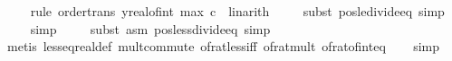 \begin{isabellebody}
\ \ \ \isamarkupfalse%
\ {\isacharparenleft}{\kern0pt}rule\ order{\isacharunderscore}{\kern0pt}trans{\isacharbrackleft}{\kern0pt}\ y{\isacharequal}{\kern0pt}{\isachardoublequoteopen}real{\isacharunderscore}{\kern0pt}of{\isacharunderscore}{\kern0pt}int\ {\isacharparenleft}{\kern0pt}max\ {\isasymlceil}c{\isasymrceil}\ {}{\isacharparenright}{\kern0pt}{\isachardoublequoteclose}{\isacharbrackright}{\kern0pt}{\isacharcomma}{\kern0pt}\ linarith{\isacharparenright}{\kern0pt}\isanewline
\ \ \ \isamarkupfalse%
\ {\isacharparenleft}{\kern0pt}subst\ pos{\isacharunderscore}{\kern0pt}le{\isacharunderscore}{\kern0pt}divide{\isacharunderscore}{\kern0pt}eq{\isacharcomma}{\kern0pt}\ simp{\isacharparenright}{\kern0pt}\isanewline
\ \ \ \isamarkupfalse%
\ simp\isanewline
\ \ \ \isamarkupfalse%
\ {\isacharparenleft}{\kern0pt}subst\ {\isacharparenleft}{\kern0pt}asm{\isacharparenright}{\kern0pt}\ pos{\isacharunderscore}{\kern0pt}less{\isacharunderscore}{\kern0pt}divide{\isacharunderscore}{\kern0pt}eq{\isacharcomma}{\kern0pt}\ simp{\isacharparenright}{\kern0pt}\isanewline
\ \ \ \isamarkupfalse%
\ {\isacharparenleft}{\kern0pt}metis\ less{\isacharunderscore}{\kern0pt}eq{\isacharunderscore}{\kern0pt}real{\isacharunderscore}{\kern0pt}def\ mult{\isachardot}{\kern0pt}commute\ of{\isacharunderscore}{\kern0pt}rat{\isacharunderscore}{\kern0pt}less{\isacharunderscore}{\kern0pt}{}{\isacharunderscore}{\kern0pt}iff\ of{\isacharunderscore}{\kern0pt}rat{\isacharunderscore}{\kern0pt}mult\ of{\isacharunderscore}{\kern0pt}rat{\isacharunderscore}{\kern0pt}of{\isacharunderscore}{\kern0pt}int{\isacharunderscore}{\kern0pt}eq{\isacharparenright}{\kern0pt}\isanewline
\ \ \isamarkupfalse%
\ simp%
\endisatagproof
{\isafoldproof}%
%
\isadelimproof
\isanewline
%
\endisadelimproof
%
\isadelimtheory
\isanewline
%
\endisadelimtheory
%
\isatagtheory
{}\isamarkupfalse%
%
\endisatagtheory
{\isafoldtheory}%
%
\isadelimtheory
%
\endisadelimtheory
%
\end{isabellebody}%
\endinput
